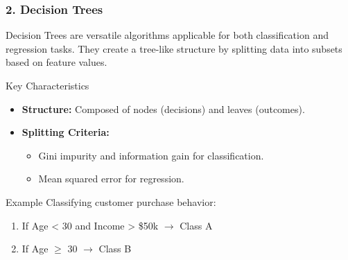 \documentclass[aspectratio=169]{beamer}
\begin{document}
\begin{frame}[fragile]
    \frametitle{2. Decision Trees}
    Decision Trees are versatile algorithms applicable for both classification and regression tasks. They create a tree-like structure by splitting data into subsets based on feature values.
    
    \begin{block}{Key Characteristics}
        \begin{itemize}
            \item \textbf{Structure:} Composed of nodes (decisions) and leaves (outcomes).
            \item \textbf{Splitting Criteria:} 
            \begin{itemize}
                \item Gini impurity and information gain for classification.
                \item Mean squared error for regression.
            \end{itemize}
        \end{itemize}
    \end{block}
    
    \begin{block}{Example}
        Classifying customer purchase behavior:
        \begin{enumerate}
            \item If Age < 30 and Income > \$50k \(\rightarrow\) Class A
            \item If Age \(\geq\) 30 \(\rightarrow\) Class B
        \end{enumerate}
    \end{block}
\end{frame}
\end{document}
